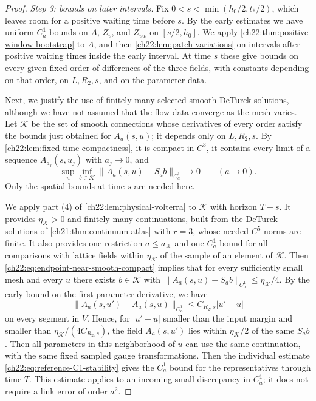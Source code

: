 \begin{proof}
\emph{Step 3: bounds on later intervals.} Fix $0<s<\min(h_0/2,t_*/2)$, which leaves room for a positive waiting time before $s$. By the early estimates we have uniform $C_a^1$ bounds on $A$, $Z_v$, and $Z_{vw}$ on $[s/2,h_0]$. We apply \cref{ch22:thm:positive-window-bootstrap} to $A$, and then \cref{ch22:lem:patch-variations} on intervals after positive waiting times inside the early interval. At time $s$ these give bounds on every given fixed order of differences of the three fields, with constants depending on that order, on $L,R_2,s$, and on the parameter data.

Next, we justify the use of finitely many selected smooth DeTurck solutions, although we have not assumed that the flow data converge as the mesh varies. Let $\mathscr K$ be the set of smooth connections whose derivatives of every order satisfy the bounds just obtained for $A_a(s,u)$; it depends only on $L,R_2,s$. By \cref{ch22:lem:fixed-time-compactness}, it is compact in $C^3$, it contains every limit of a sequence $A_{a_j}(s,u_j)$ with $a_j\to0$, and
\begin{equation}\label{ch22:eq:endpoint-near-smooth-compact}
 \sup_u\inf_{b\in\mathscr K}\|A_a(s,u)-S_ab\|_{C_a^1}\longrightarrow0\qquad(a\to0).
\end{equation}
Only the spatial bounds at time $s$ are needed here.

We apply part (4) of \cref{ch22:lem:physical-volterra} to $\mathscr K$ with horizon $T-s$. It provides $\eta_{\mathscr K}>0$ and finitely many continuations, built from the DeTurck solutions of \cref{ch21:thm:continuum-atlas} with $r=3$, whose needed $C^5$ norms are finite. It also provides one restriction $a\le a_{\mathscr K}$ and one $C_a^1$ bound for all comparisons with lattice fields within $\eta_{\mathscr K}$ of the sample of an element of $\mathscr K$. Then \eqref{ch22:eq:endpoint-near-smooth-compact} implies that for every sufficiently small mesh and every $u$ there exists $b\in\mathscr K$ with $\|A_a(s,u)-S_ab\|_{C_a^1}\le\eta_{\mathscr K}/4$. By the early bound on the first parameter derivative, we have
\[
 \|A_a(s,u')-A_a(s,u)\|_{C_a^1}\le C_{R_2,s}|u'-u|
\]
on every segment in $V$. Hence, for $|u'-u|$ smaller than the input margin and smaller than $\eta_{\mathscr K}/(4C_{R_2,s})$, the field $A_a(s,u')$ lies within $\eta_{\mathscr K}/2$ of the same $S_ab$. Then all parameters in this neighborhood of $u$ can use the same continuation, with the same fixed sampled gauge transformations. Then the individual estimate \eqref{ch22:eq:reference-C1-stability} gives the $C_a^1$ bound for the representatives through time $T$. This estimate applies to an incoming small discrepancy in $C^1_a$; it does not require a link error of order $a^2$.


\end{proof}
